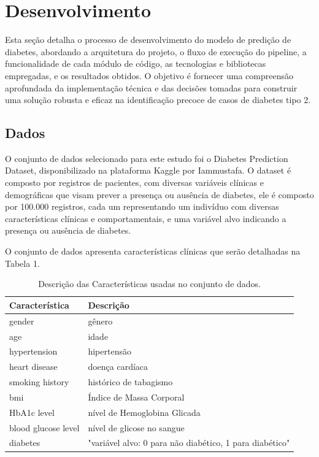 
\chapter{Desenvolvimento}
Esta seção detalha o processo de desenvolvimento do modelo de predição de diabetes, abordando a arquitetura do projeto, o fluxo de execução do pipeline, a funcionalidade de cada módulo de código, as tecnologias e bibliotecas empregadas, e os resultados obtidos. O objetivo é fornecer uma compreensão aprofundada da implementação técnica e das decisões tomadas para construir uma solução robusta e eficaz na identificação precoce de casos de diabetes tipo 2.

\section{Dados}
O conjunto de dados selecionado para este estudo foi o Diabetes Prediction Dataset, disponibilizado na plataforma Kaggle por Iammustafa\cite{Iammustafa2022}. O dataset é composto por registros de pacientes, com diversas variáveis clínicas e demográficas que visam prever a presença ou ausência de diabetes, ele é composto por 100.000 registros, cada um representando um indivíduo com diversas características clínicas e comportamentais, e uma variável alvo indicando a presença ou ausência de diabetes.

O conjunto de dados apresenta características clínicas que serão detalhadas na Tabela 1. 

\begin{table}[H]
    \centering
    \caption{Descrição das Características usadas no conjunto de dados.}
    \label{tab:features}
    \begin{tabular}{@{}ll@{}}
        \toprule
        \textbf{Característica} & \textbf{Descrição} \\
        \midrule
        gender & gênero \\
        age & idade \\
        hypertension & hipertensão \\
        heart disease & doença cardíaca \\
        smoking history & histórico de tabagismo \\
        bmi & Índice de Massa Corporal \\
        HbA1c level & nível de Hemoglobina Glicada \\
        blood glucose level & nível de glicose no sangue \\
        diabetes & "variável alvo: 0 para não diabético, 1 para diabético" \\
        \bottomrule
    \end{tabular}
\end{table}

